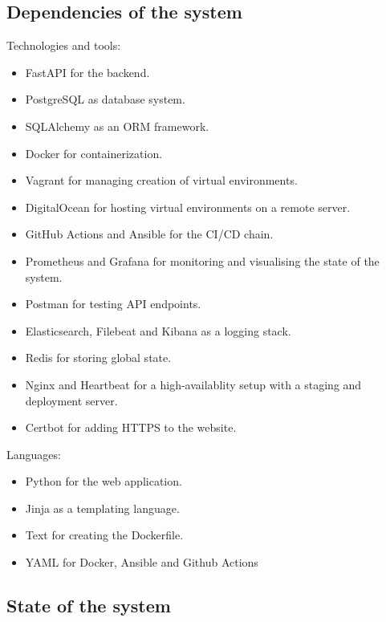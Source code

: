 \documentclass{article}
\begin{document}
\subsection{Dependencies of the system}

Technologies and tools:

\begin{multicols}{2}
\begin{itemize}
    \item FastAPI for the backend.
    \item PostgreSQL as database system.
    \item SQLAlchemy as an ORM framework.
    \item Docker for containerization.
    \item Vagrant for managing creation of virtual environments.
    \item DigitalOcean for hosting virtual environments on a remote server.
    \item GitHub Actions and Ansible for the CI/CD chain.
\end{itemize}
\vfill\null
\columnbreak
\begin{itemize}

    \item Prometheus and Grafana for monitoring and visualising the state of the system.
    \item Postman for testing API endpoints.
    \item Elasticsearch, Filebeat and Kibana as a logging stack.
    \item Redis for storing global state.
    \item Nginx and Heartbeat for a high-availablity setup with a staging and deployment server.
    \item Certbot for adding HTTPS to the website.
\end{itemize}
\vfill\null
\end{multicols}
Languages:
\begin{itemize}
    \item Python for the web application.
    \item Jinja as a templating language.
    \item Text for creating the Dockerfile.
    \item YAML for Docker, Ansible and Github Actions
\end{itemize}

\subsection{State of the system}
\end{document}
